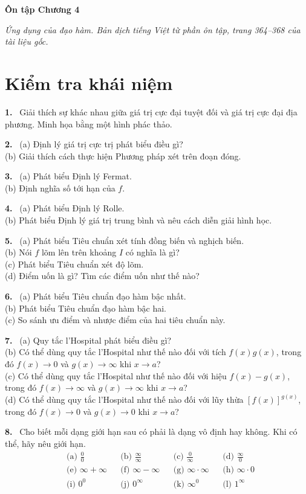 \documentclass[12pt,a4paper]{article}
\newcommand{\bt}[1]{\par\smallskip\Needspace{5\baselineskip}\noindent\textbf{#1.}\ }
\newcommand{\cc}[1]{\bt{#1}}
\begin{document}
\begin{center}{\LARGE\bfseries Ôn tập Chương 4}\end{center}
\noindent\textit{Ứng dụng của đạo hàm. Bản dịch tiếng Việt từ phần ôn tập, trang 364–368 của tài liệu gốc.}
\section*{Kiểm tra khái niệm}
\cc{1} Giải thích sự khác nhau giữa giá trị cực đại tuyệt đối và giá trị cực đại địa phương. Minh họa bằng một hình phác thảo.
\cc{2} (a) Định lý giá trị cực trị phát biểu điều gì?\\(b) Giải thích cách thực hiện Phương pháp xét trên đoạn đóng.
\cc{3} (a) Phát biểu Định lý Fermat.\\(b) Định nghĩa số tới hạn của $f$.
\cc{4} (a) Phát biểu Định lý Rolle.\\(b) Phát biểu Định lý giá trị trung bình và nêu cách diễn giải hình học.
\cc{5} (a) Phát biểu Tiêu chuẩn xét tính đồng biến và nghịch biến.\\(b) Nói $f$ lõm lên trên khoảng $I$ có nghĩa là gì?\\(c) Phát biểu Tiêu chuẩn xét độ lõm.\\(d) Điểm uốn là gì? Tìm các điểm uốn như thế nào?
\cc{6} (a) Phát biểu Tiêu chuẩn đạo hàm bậc nhất.\\(b) Phát biểu Tiêu chuẩn đạo hàm bậc hai.\\(c) So sánh ưu điểm và nhược điểm của hai tiêu chuẩn này.
\cc{7} (a) Quy tắc l’Hospital phát biểu điều gì?\\(b) Có thể dùng quy tắc l’Hospital như thế nào đối với tích $f(x)g(x)$, trong đó $f(x)\to0$ và $g(x)\to\infty$ khi $x\to a$?\\(c) Có thể dùng quy tắc l’Hospital như thế nào đối với hiệu $f(x)-g(x)$, trong đó $f(x)\to\infty$ và $g(x)\to\infty$ khi $x\to a$?\\(d) Có thể dùng quy tắc l’Hospital như thế nào đối với lũy thừa $[f(x)]^{g(x)}$, trong đó $f(x)\to0$ và $g(x)\to0$ khi $x\to a$?
\cc{8} Cho biết mỗi dạng giới hạn sau có phải là dạng vô định hay không. Khi có thể, hãy nêu giới hạn.
\begin{align*}
&\text{(a) }\frac00 &&\text{(b) }\frac\infty\infty &&\text{(c) }\frac0\infty &&\text{(d) }\frac\infty0\\
&\text{(e) }\infty+\infty &&\text{(f) }\infty-\infty &&\text{(g) }\infty\cdot\infty &&\text{(h) }\infty\cdot0\\
&\text{(i) }0^0 &&\text{(j) }0^\infty &&\text{(k) }\infty^0 &&\text{(l) }1^\infty
\end{align*}
\end{document}
